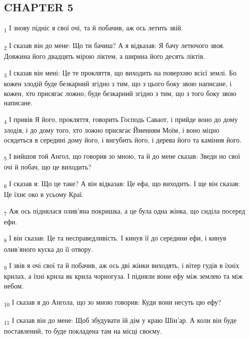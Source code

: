 \subsection{CHAPTER 5}
\begin{tcolorbox}
\textsubscript{1} І знову підніс я свої очі, та й побачив, аж ось летить звій.
\end{tcolorbox}
\begin{tcolorbox}
\textsubscript{2} І сказав він до мене: Що ти бачиш? А я відказав: Я бачу летючого звоя. Довжина його двадцять мірою ліктем, а ширина його десять ліктів.
\end{tcolorbox}
\begin{tcolorbox}
\textsubscript{3} І сказав він мені: Це те прокляття, що виходить на поверхню всієї землі. Бо кожен злодій буде безкарний згідно з тим, що з цього боку звою написане, і кожен, хто присягає ложно, буде безкарний згідно з тим, що з того боку звою написане.
\end{tcolorbox}
\begin{tcolorbox}
\textsubscript{4} І привів Я його, прокляття, говорить Господь Саваот, і прийде воно до дому злодія, і до дому того, хто ложно присягає Йменням Моїм, і воно міцно осядеться в середині дому його, і вигубить його, і дерева його та каміння його.
\end{tcolorbox}
\begin{tcolorbox}
\textsubscript{5} І вийшов той Ангол, що говорив зо мною, та й до мене сказав: Зведи но свої очі й побач, що це виходить?
\end{tcolorbox}
\begin{tcolorbox}
\textsubscript{6} І сказав я: Що це таке? А він відказав: Це ефа, що виходить. І ще він сказав: Це їхнє око в усьому Краї.
\end{tcolorbox}
\begin{tcolorbox}
\textsubscript{7} Аж ось піднялася олив'яна покришка, а це була одна жінка, що сиділа посеред ефи.
\end{tcolorbox}
\begin{tcolorbox}
\textsubscript{8} І він сказав: Це та несправедливість. І кинув її до середини ефи, і кинув олив'яного куска до її отвору.
\end{tcolorbox}
\begin{tcolorbox}
\textsubscript{9} І звів я очі свої та й побачив, аж ось дві жінки виходять, і вітер гудів в їхніх крилах, а їхні крила як крила чорногуза. І підняли вони ефу між землею та між небом.
\end{tcolorbox}
\begin{tcolorbox}
\textsubscript{10} І сказав я до Ангола, що зо мною говорив: Куди вони несуть цю ефу?
\end{tcolorbox}
\begin{tcolorbox}
\textsubscript{11} І сказав він до мене: Щоб збудувати їй дім у краю Шін'ар. А коли він буде поставлений, то буде покладена там на місці своєму.
\end{tcolorbox}
